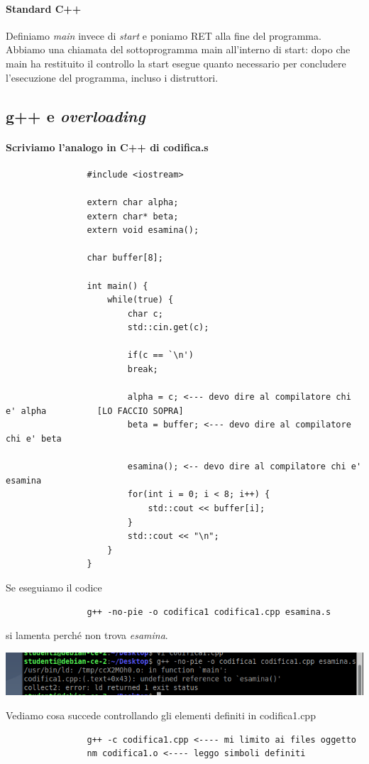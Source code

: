 			\paragraph{Standard C++}  Definiamo \emph{main} invece di \emph{start} e poniamo RET alla fine del programma. Abbiamo una chiamata del sottoprogramma main all'interno di start: dopo che main ha restituito il controllo la start esegue quanto necessario per concludere l'esecuzione del programma, incluso i distruttori.
			\subsection{g++ e \emph{overloading}}
			\paragraph{Scriviamo l'analogo in C++ di codifica.s}
			\begin{verbatim}
				#include <iostream>
				
				extern char alpha; 
				extern char* beta;
				extern void esamina();
				
				char buffer[8];
				
				int main() {
					while(true) {
						char c;
						std::cin.get(c);
						
						if(c == `\n')
						break;
						
						alpha = c; <--- devo dire al compilatore chi e' alpha          [LO FACCIO SOPRA]
						beta = buffer; <--- devo dire al compilatore chi e' beta
						
						esamina(); <-- devo dire al compilatore chi e' esamina
						for(int i = 0; i < 8; i++) {
							std::cout << buffer[i];
						}
						std::cout << "\n";
					}
				}
			\end{verbatim}
			\clearpage
			\noindent Se eseguiamo il codice
			\begin{verbatim}
				g++ -no-pie -o codifica1 codifica1.cpp esamina.s
			\end{verbatim}
			si lamenta perché non trova \emph{esamina}. 
			\begin{center}
				\includegraphics{img/151.PNG}
			\end{center} 
			Vediamo cosa succede controllando gli elementi definiti in codifica1.cpp
			\begin{verbatim}
				g++ -c codifica1.cpp <---- mi limito ai files oggetto
				nm codifica1.o <---- leggo simboli definiti
			\end{verbatim}
